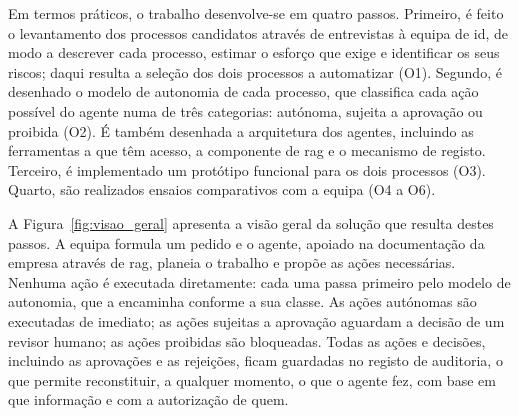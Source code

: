 Em termos práticos, o trabalho desenvolve-se em quatro passos. Primeiro, é feito o levantamento dos processos candidatos através de entrevistas à equipa de \gls{id}, de modo a descrever cada processo, estimar o esforço que exige e identificar os seus riscos; daqui resulta a seleção dos dois processos a automatizar (O1). Segundo, é desenhado o modelo de autonomia de cada processo, que classifica cada ação possível do agente numa de três categorias: autónoma, sujeita a aprovação ou proibida (O2). É também desenhada a arquitetura dos agentes, incluindo as ferramentas a que têm acesso, a componente de \gls{rag} e o mecanismo de registo. Terceiro, é implementado um protótipo funcional para os dois processos (O3). Quarto, são realizados ensaios comparativos com a equipa (O4 a O6).

A Figura~\ref{fig:visao_geral} apresenta a visão geral da solução que resulta destes passos. A equipa formula um pedido e o agente, apoiado na documentação da empresa através de \gls{rag}, planeia o trabalho e propõe as ações necessárias. Nenhuma ação é executada diretamente: cada uma passa primeiro pelo modelo de autonomia, que a encaminha conforme a sua classe. As ações autónomas são executadas de imediato; as ações sujeitas a aprovação aguardam a decisão de um revisor humano; as ações proibidas são bloqueadas. Todas as ações e decisões, incluindo as aprovações e as rejeições, ficam guardadas no registo de auditoria, o que permite reconstituir, a qualquer momento, o que o agente fez, com base em que informação e com a autorização de quem.

